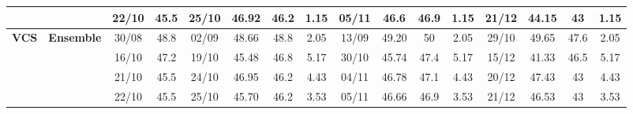 \documentclass{ieeeaccess}
\begin{document}
\begin{table}[!h]
\begin{tabular}{llcc|cccc|cccc|cccc}
&
& 22/10 & 45.5 & 25/10 & 46.92 & 46.2 & 1.15 & 05/11 & 46.6 & 46.9 & 1.15 & 21/12 & 44.15 & 43 & 1.15 \\
\midrule



\multirow{4}{*}{\textbf{VCS}} 
& \textbf{Ensemble}
& 30/08 & 48.8 & 02/09 & 48.66 & 48.8 & 2.05 & 13/09 & 49.20 & 50 & 2.05 & 29/10 & 49.65 & 47.6 & 2.05 \\

&
& 16/10 & 47.2 & 19/10 & 45.48 & 46.8 & 5.17 & 30/10 & 45.74 & 47.4 & 5.17 & 15/12 & 41.33 & 46.5 & 5.17 \\

&
& 21/10 & 45.5 & 24/10 & 46.95 & 46.2 & 4.43 & 04/11 & 46.78 & 47.1 & 4.43 & 20/12 & 47.43 & 43 & 4.43 \\

&
& 22/10 & 45.5 & 25/10 & 45.70 & 46.2 & 3.53 & 05/11 & 46.66 & 46.9 & 3.53 & 21/12 & 46.53 & 43 & 3.53  \\


\bottomrule
\end{tabular}
\end{table}
\end{document}
